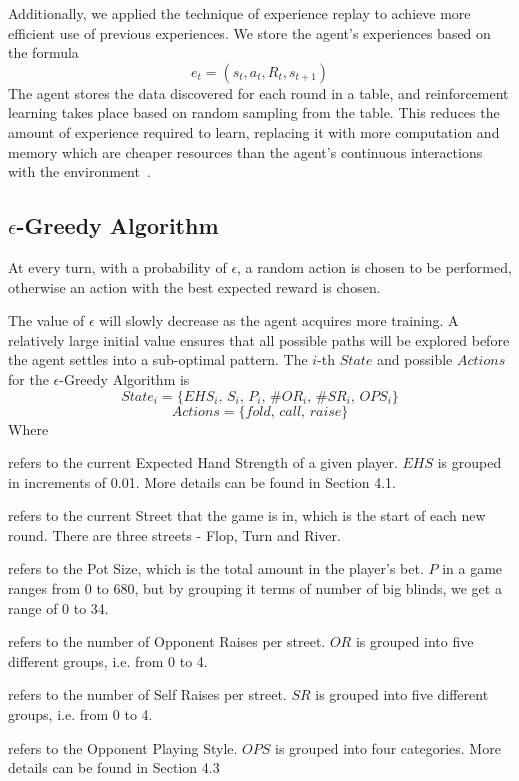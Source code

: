 \documentclass{article}
\begin{document}
Additionally, we applied the technique of experience replay to achieve more efficient use of previous experiences. We store the agent's experiences based on the formula
\begin{displaymath}
e_t=\left(s_t,a_t,R_t,s_{t+1}\right)
\end{displaymath}
The agent stores the data discovered for each round in a table, and reinforcement learning takes place based on random sampling from the table. This reduces the amount of experience required to learn, replacing it with more computation and memory which are cheaper resources than the agent's continuous interactions with the environment~\cite{sqas:replay}.

\subsection{$\epsilon$-Greedy Algorithm}

At every turn, with a probability of $\epsilon$, a random action is chosen to be performed, otherwise an action with the best expected reward is chosen.

The value of $\epsilon$ will slowly decrease as the agent acquires more training. A relatively large initial value ensures that all possible paths will be explored before the agent settles into a sub-optimal pattern. The $i$-th $State$ and possible $Actions$ for the $\epsilon$-Greedy Algorithm is
\begin{displaymath}
State_i = \{ EHS_i \text{, } S_i \text{, }P_i\text{, }\#OR_i\text{, }\#SR_i\text{, }OPS_i\}
\end{displaymath}
\begin{displaymath}
Actions = \{ fold\text{, }call\text{, }raise \}
\end{displaymath}
Where

\begin{description}[style=multiline,leftmargin=10mm]
\item [\emph{EHS}]refers to the current Expected Hand Strength of a given player. $EHS$ is grouped in increments of 0.01. More details can be found in Section 4.1.
\item [\emph{S}]refers to the current Street that the game is in, which is the start of each new round. There are three streets - Flop, Turn and River.
\item [\emph{P}]refers to the Pot Size, which is the total amount in the player's bet. $P$ in a game ranges from 0 to 680, but by grouping it terms of number of big blinds, we get a range of 0 to 34.
\item [\emph{\#OR}]refers to the number of Opponent Raises per street. $OR$ is grouped into five different groups, i.e. from 0 to 4.
\item [\emph{\#SR}]refers to the number of Self Raises per street. $SR$ is grouped into five different groups, i.e. from 0 to 4.
\item [\emph{OPS}]refers to the Opponent Playing Style. $OPS$ is grouped into four categories. More details can be found in Section 4.3
\end{description}
\end{document}
